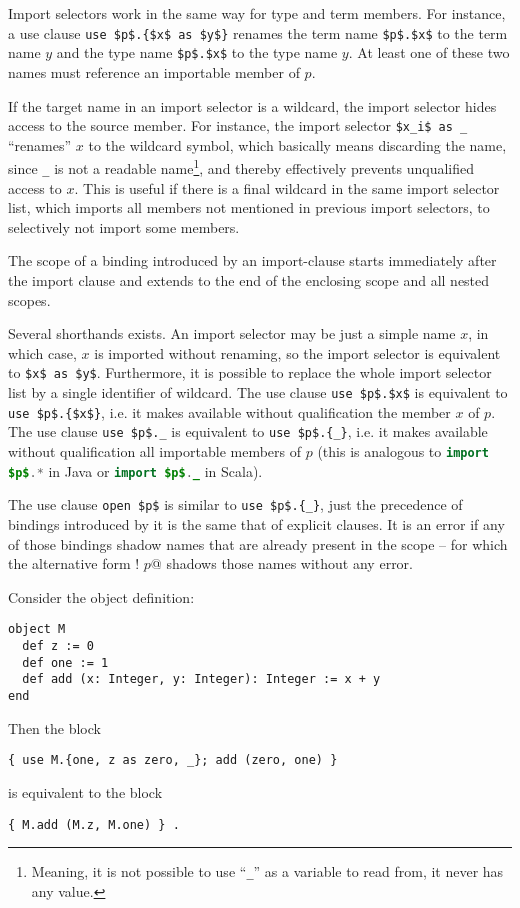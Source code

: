 Import selectors work in the same way for type and term members. For instance, a use clause \lstinline!use $p$.{$x$ as $y$}! renames the term name \lstinline!$p$.$x$! to the term name $y$ and the type name \lstinline!$p$.$x$! to the type name $y$. At least one of these two names must reference an importable member of $p$. 

If the target name in an import selector is a wildcard, the import selector hides access to the source member. For instance, the import selector \lstinline!$x_i$ as _! ``renames'' $x$ to the wildcard symbol, which basically means discarding the name, since \lstinline!_! is not a readable name\footnote{Meaning, it is not possible to use ``\lstinline!_!'' as a variable to read from, it never has any value.}, and thereby effectively prevents unqualified access to $x$. This is useful if there is a final wildcard in the same import selector list, which imports all members not mentioned in previous import selectors, to selectively not import some members. 

The scope of a binding introduced by an import-clause starts immediately after the import clause and extends to the end of the enclosing scope and all nested scopes. 

Several shorthands exists. An import selector may be just a simple name $x$, in which case, $x$ is imported without renaming, so the import selector is equivalent to \lstinline!$x$ as $y$!. Furthermore, it is possible to replace the whole import selector list by a single identifier of wildcard. The use clause \lstinline!use $p$.$x$! is equivalent to \lstinline!use $p$.{$x$}!, i.e. it makes available without qualification the member $x$ of $p$. The use clause \lstinline!use $p$._! is equivalent to \lstinline!use $p$.{_}!, i.e. it makes available without qualification all importable members of $p$ (this is analogous to \lstinline[language=Java]!import $p$.*! in Java or \lstinline[language=Java]!import $p$._! in Scala). 

The use clause \lstinline!open $p$! is similar to \lstinline!use $p$.{_}!, just the precedence of bindings introduced by it is the same that of explicit  clauses. It is an error if any of those bindings shadow names that are already present in the scope -- for which the alternative form \lstinline@open! $p$@ shadows those names without any error. 

\example Consider the object definition:
\begin{lstlisting}
object M
  def z := 0
  def one := 1
  def add (x: Integer, y: Integer): Integer := x + y
end
\end{lstlisting}
Then the block
\begin{lstlisting}
{ use M.{one, z as zero, _}; add (zero, one) }
\end{lstlisting}
is equivalent to the block
\begin{lstlisting}
{ M.add (M.z, M.one) } .
\end{lstlisting}

